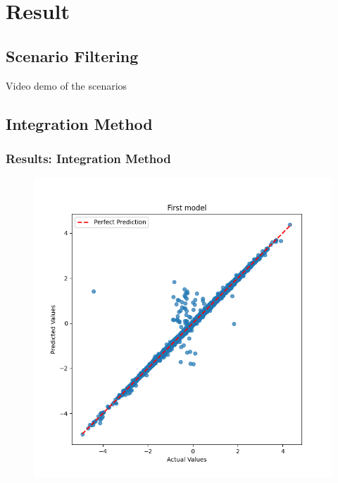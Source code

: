 
\section{Result}

\subsection{Scenario Filtering}
\begin{frame}
    \center Video demo of the scenarios
\end{frame}


\subsection{Integration Method}

\begin{frame}
  \frametitle{Results: Integration Method}
  \begin{figure}
    \centering
    \begin{minipage}[b]{0.45\linewidth}
      \centering
      \includegraphics[width=\textwidth]{figures/graphs/First model.png}
    \end{minipage}
    \begin{minipage}[b]{0.45\linewidth}
      \centering

\end{minipage}
\end{figure}
\end{frame}
